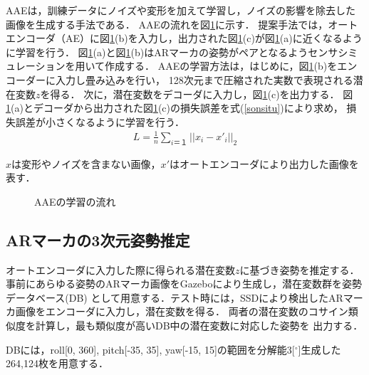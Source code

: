 \documentclass{jsarticle}
\begin{document}
AAEは，訓練データにノイズや変形を加えて学習し，ノイズの影響を除去した画像を生成する手法である．
AAEの流れを図\ref{BB}に示す．
提案手法では，オートエンコーダ（AE）に図\ref{BB}(b)を入力し，出力された図\ref{BB}(c)が図\ref{BB}(a)に近くなるように学習を行う．
図\ref{BB}(a)と図\ref{BB}(b)はARマーカの姿勢がペアとなるようセンサシミュレーションを用いて作成する．
AAEの学習方法は，はじめに，図\ref{BB}(b)をエンコーダーに入力し畳み込みを行い，
128次元まで圧縮された実数で表現される潜在変数$z$を得る．
次に，潜在変数をデコーダに入力し，図\ref{BB}(c)を出力する．
図\ref{BB}(a)とデコーダから出力された図\ref{BB}(c)の損失誤差を式(\ref{sonsitu})により求め，
損失誤差が小さくなるように学習を行う．
\begin{eqnarray}
\label{sonsitu}
L=\frac{1}{n}\sum_{i＝１} ||x_i-x'_i||_2
\end{eqnarray}

$x$は変形やノイズを含まない画像，$x'$はオートエンコーダにより出力した画像を表す．

\begin{figure}[ht]
\vspace{-1zh}
\setlength{\epsfxsize}{7cm}
\centerline{}
\vspace{0zh}
\caption{AAEの学習の流れ}
\label{BB}
\vspace{-2zh}
\end{figure}


\subsection{ARマーカの3次元姿勢推定}
オートエンコーダに入力した際に得られる潜在変数$z$に基づき姿勢を推定する．
事前にあらゆる姿勢のARマーカ画像をGazeboにより生成し，潜在変数群を姿勢データベース(DB)
として用意する．テスト時には，SSDにより検出したARマーカ画像をエンコーダに入力し，潜在変数を得る．
両者の潜在変数のコサイン類似度を計算し，最も類似度が高いDB中の潜在変数に対応した姿勢を
出力する．

DBには，roll[0, 360], pitch[-35, 35], yaw[-15, 15]の範囲を分解能3[$^\circ$]生成した264,124枚を用意する．





\end{document}
